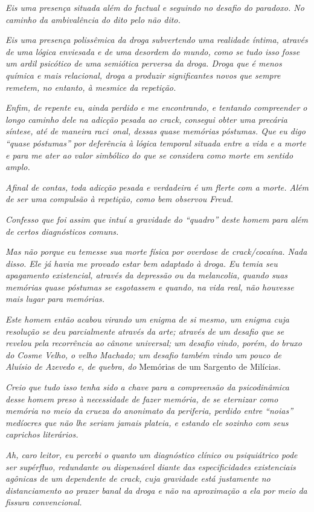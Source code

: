 \emph{Eis uma presença situada além do factual e seguindo no desafio do
paradoxo. No caminho da ambivalência do dito pelo não dito.}

\emph{Eis uma presença polissêmica da droga subvertendo uma realidade
íntima, através de uma lógica enviesada e de uma desordem do mundo, como
se tudo isso fosse um ardil psicótico de uma semiótica perversa da
droga. Droga que é menos química e mais relacional, droga a produzir
significantes novos que sempre remetem, no entanto, à mesmice da
repetição.}

\emph{Enfim, de repente eu, ainda perdido e me encontrando, e tentando
compreender o longo caminho dele na adicção pesada ao crack, consegui
obter uma precária síntese, até de maneira raci~onal, dessas quase
memórias póstumas. Que eu digo ``quase póstumas'' por deferência à
lógica temporal situada entre a vida e a morte e para me ater ao valor
simbólico do que se considera como morte em sentido amplo.}

\emph{Afinal de contas, toda adicção pesada e verdadeira é um flerte com
a morte. Além de ser uma compulsão à repetição, como bem observou
Freud.}

\emph{Confesso que foi assim que intuí a gravidade do ``quadro'' deste
homem para além de certos diagnósticos comuns.}

\emph{Mas não porque eu temesse sua morte física por overdose de
crack/cocaína. Nada disso. Ele já havia me provado estar bem adaptado à
droga. Eu temia seu apagamento existencial, através da depressão ou da
melancolia, quando suas memórias quase póstumas se esgotassem e quando,
na vida real, não houvesse mais lugar para memórias.}

\emph{Este homem então acabou virando um enigma de si mesmo, um enigma
cuja resolução se deu parcialmente através da arte; através de um
desafio que se revelou pela recorrência ao cânone universal; um desafio
vindo, porém, do bruxo do Cosme Velho, o velho Machado; um desafio
também vindo um pouco de Aluísio de Azevedo e, de quebra, do} Memórias
de um Sargento de Milícias.

\emph{Creio que tudo isso tenha sido a chave para a compreensão da
psicodinâmica desse homem preso à necessidade de fazer memória, de se
eternizar como memória no meio da crueza do anonimato da periferia,
perdido entre ``noias'' medíocres que não lhe seriam jamais plateia, e
estando ele sozinho com seus caprichos literários.}

\emph{Ah, caro leitor, eu percebi o quanto um diagnóstico clínico ou
psiquiátrico pode ser supérfluo, redundante ou dispensável diante das
especificidades existenciais agônicas de um dependente de crack, cuja
gravidade está justamente no distanciamento ao prazer banal da droga e
não na aproximação a ela por meio da fissura convencional.}

